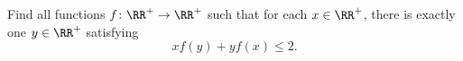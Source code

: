 Find all functions $f \colon \RR^+ \to \RR^+$ such that for each $x \in \RR^+$,
there is exactly one $y \in \RR^+$ satisfying \[ xf(y)+yf(x) \leq 2. \]